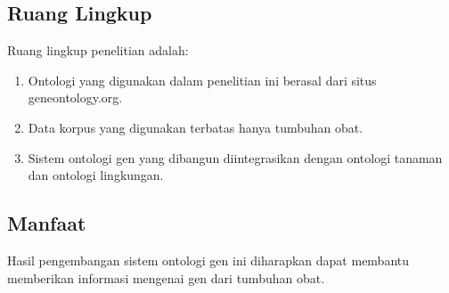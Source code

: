 \subsection*{Ruang Lingkup}
Ruang lingkup penelitian adalah:
\begin{enumerate}[noitemsep] 
\item Ontologi yang digunakan dalam penelitian ini berasal dari situs geneontology.org.
\item Data korpus yang digunakan terbatas hanya tumbuhan obat. 
\item Sistem ontologi gen yang dibangun diintegrasikan dengan ontologi tanaman dan ontologi lingkungan.
\end{enumerate}

\subsection*{Manfaat}
Hasil pengembangan sistem ontologi gen ini diharapkan dapat membantu memberikan informasi mengenai gen dari tumbuhan obat.
